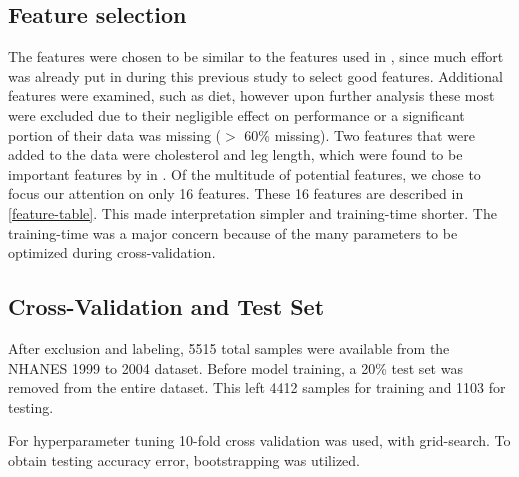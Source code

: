\documentclass{article} %
\begin{document}
\subsection{Feature selection}
The features were chosen to be similar to the features used in \cite{yu_application_2010}, since much effort was already put in during this previous study to select good features. Additional features were examined, such as diet, however upon further analysis these most were excluded due to their negligible effect on performance or a significant portion of their data was missing ($>$ 60\% missing). Two features that were added to the data were cholesterol and leg length, which were found to be important features by in \cite{heredia2013genetic}. Of the multitude of potential features, we chose to focus our attention on only 16 features. These 16 features are described in \ref{feature-table}. This made interpretation simpler and training-time shorter. The training-time was a major concern because of the many parameters to be optimized during cross-validation.

\subsection{Cross-Validation and Test Set}
After exclusion and labeling, 5515 total samples were available from the NHANES 1999 to 2004 dataset. Before model training, a 20\% test set was removed from the entire dataset. This left 4412 samples for training and 1103 for testing. 

For hyperparameter tuning 10-fold cross validation was used, with grid-search. To obtain testing accuracy error, bootstrapping was utilized. 
\end{document}
